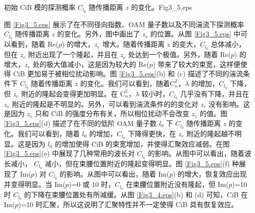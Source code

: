 \documentclass[master]{thesis-uestc}
\begin{document}
\begin{pics}[H]{初始 CiB 模的探测概率 $C_{l_0}$ 随传播距离 $z$ 的变化。}{Fig3_5.eps}
\end{pics}

图 \ref{Fig3_5.eps} 展示了在不同径向指数、OAM 量子数以及不同湍流下探测概率 $C_{l_0}$ 随传播距离 $z$ 的变化。另外，图中画出了 $z_e$ 的位置。从图 \ref{Fig3_5.eps} 中可以看到，随着 Re($p$) 的增大，$z_e$ 增大。随着传播距离 $z$ 的变大，$C_{l_0}$ 总体减小，但在 $z_e$ 附近出现了一个隆起，并且在 $z_e$ 处达到一个极值。另外，随着 Re($p$) 的增大，$z_e$ 处的极大值减小，这是因为较大的 Re($p$) 带来了较大的束宽，这样便使得 CiB 更加易于被相位扰动影响。图 \ref{Fig3_5.eps}(b) 和 (c) 描述了不同的湍流条件下 $C_{l_0}$  随着传播距离 $z$ 的变化。我们可以看到，随着$\mathrm{C}^2_n$，$\lambda$ 的增加，$C_{l_0}$ 下降，但 $z_e$ 附近的隆起会变得更加明显。在 $\mathrm{C}^2_n$，$\lambda$ 较小时，$C_{l_0}$ 几乎没有下降，并且在 $z_e$ 附近的隆起是不明显的。另外，可以看到湍流条件的的变化对 $z_e$ 没有影响。这是因为 $z_e$ 只和 CiB 的强度分布有关，所以相位扰动不会改变 $z_e$ 的值。图 \ref{Fig3_5.eps}(d) 描述了在不同的低阶 OAM 量子数 $l_0$ 下 $C_{l_0}$ 随传播距离 $z$ 的变化。我们可以看到，随着 $l_0$ 的增加，$C_{l_0}$ 下降得更快，在 $z_e$ 附近的隆起越不明显。这是因为 $l_0$ 的增加使得 CiB 的束宽增加，并使得汇聚效应减弱。在图 \ref{Fig3_5.eps}(e) 中展现了几种常用的波长对 $C_{l_0}$ 的影响。从图中可以看出，随着波长减小， $C_{l_0}$ 减小，但在束腰位置附近的隆起变得明显。图 \ref{Fig3_5.eps}(f) 种展现了 Im($p$) 对 $C_{l_0}$ 的影响。从图中可以看出，随着 Im($p$) 的增大，恢复效应出现并变得明显。当 Im($p$)=0 或 10 时，$C_{l_0}$ 在束腰位置附近没有隆起，但 Im($p$)=10 时 $C_{l_0}$ 的下降在束腰位置处有所减缓。从图 \ref{Fig3_4.eps}(b) 和 (d) 可知，CiB 在 Im($p$)=10 时汇聚，所以这说明了汇聚特性并不一定使得 CiB 具有恢复效应。
\end{document}
